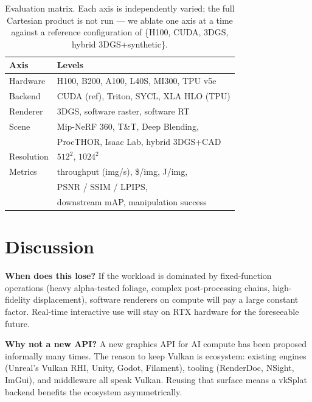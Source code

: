 \documentclass[10pt,journal]{IEEEtran}
\begin{document}
\begin{table}[t]
\centering
\caption{Evaluation matrix. Each axis is independently varied; the
full Cartesian product is not run --- we ablate one axis at a time
against a reference configuration of \{H100, CUDA, 3DGS,
hybrid 3DGS+synthetic\}.}
\label{tab:eval}
\small
\begin{tabular}{@{}ll@{}}
\toprule
\textbf{Axis} & \textbf{Levels} \\
\midrule
Hardware  & H100, B200, A100, L40S, MI300, TPU v5e \\
Backend   & CUDA (ref), Triton, SYCL, XLA HLO (TPU) \\
Renderer  & 3DGS, software raster, software RT \\
Scene     & Mip-NeRF 360, T\&T, Deep Blending,\\
          & ProcTHOR, Isaac Lab, hybrid 3DGS+CAD \\
Resolution & $512^2$, $1024^2$ \\
\midrule
Metrics   & throughput (img/s), \$/img, J/img, \\
          & PSNR / SSIM / LPIPS, \\
          & downstream mAP, manipulation success \\
\bottomrule
\end{tabular}
\end{table}

\section{Discussion}

\textbf{When does this lose?} If the workload is dominated by
fixed-function operations (heavy alpha-tested foliage, complex
post-processing chains, high-fidelity displacement), software renderers
on compute will pay a large constant factor. Real-time interactive use
will stay on RTX hardware for the foreseeable future.

\textbf{Why not a new API?} A new graphics API for AI compute has been
proposed informally many times. The reason to keep Vulkan is ecosystem:
existing engines (Unreal's Vulkan RHI, Unity, Godot, Filament), tooling
(RenderDoc, NSight, ImGui), and middleware all speak Vulkan. Reusing
that surface means a vkSplat backend benefits the ecosystem
asymmetrically.
\end{document}

